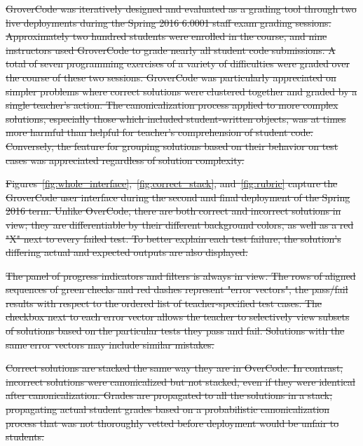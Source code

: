 \documentclass[12pt,twoside]{mitthesis}
\providecommand{\DIFdeltex}[1]{{\protect\color{red}\sout{#1}}}                      %
\providecommand{\DIFdel}[1]{\texorpdfstring{\DIFdeltex{#1}}{}} %
\begin{document}
{{{{{{{{{{%
\DIFdel{GroverCode was iteratively designed and evaluated as a grading tool through two live deployments during the Spring 2016 6.0001 staff exam grading sessions. Approximately two hundred students were enrolled in the course, and nine instructors used GroverCode to grade nearly all student code submissions. A total of seven programming exercises of a variety of difficulties were graded over the course of these two sessions. GroverCode was particularly appreciated on simpler problems where correct solutions were clustered together and graded by a single teacher's action. The canonicalization process applied to more complex solutions, especially those which included student-written objects, was at times more harmful than helpful for teacher's comprehension of student code. Conversely, the feature for grouping solutions based on their behavior on test cases was appreciated regardless of solution complexity.
}%


\DIFdel{Figures~\ref{fig:whole_interface},~\ref{fig:correct_stack}, and~\ref{fig:rubric} capture the GroverCode user interface during the second and final deployment of the Spring 2016 term. Unlike OverCode, there are both correct and incorrect solutions in view; they are differentiable by their different background colors, as well as a red "X" next to every failed test. To better explain each test failure, the solution's differing actual and expected outputs are also displayed. 
}%

\DIFdel{The panel of progress indicators and filters is always in view. The rows of aligned sequences of green checks and red dashes represent "error vectors", the pass/fail results with respect to the ordered list of teacher-specified test cases. The checkbox next to each error vector allows the teacher to selectively view subsets of solutions based on the particular tests they pass and fail. Solutions with the same error vectors may include similar mistakes.
}%

\DIFdel{Correct solutions are stacked the same way they are in OverCode. In contrast, incorrect solutions were canonicalized but not stacked, even if they were identical after canonicalization. Grades are propagated to all the solutions in a stack; propagating actual student grades based on a probabilistic canonicalization process that was not thoroughly vetted before deployment would be unfair to students. 
}%

}}}}}}}}}}
\end{document}
